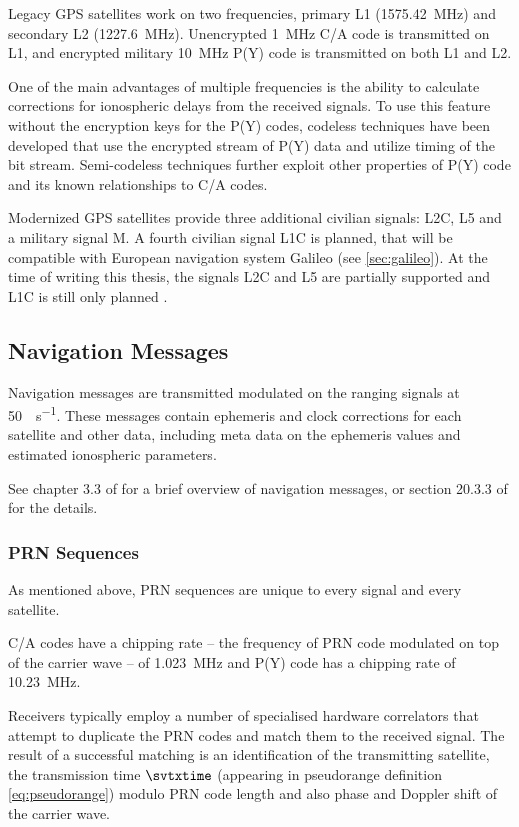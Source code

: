 Legacy GPS satellites work on two frequencies, primary L1 (\SI{1575.42}{\mega\hertz}) and secondary L2 (\SI{1227.6}{\mega\hertz}).
Unencrypted \SI{1}{\mega\hertz} C/A code is transmitted on L1, and encrypted military \SI{10}{\mega\hertz} P(Y) code is transmitted
on both L1 and L2.

One of the main advantages of multiple frequencies is the ability to calculate corrections for ionospheric delays from the received signals.
To use this feature without the encryption keys for the P(Y) codes, codeless techniques have been developed
that use the encrypted stream of P(Y) data and utilize timing of the bit stream.
Semi-codeless techniques further exploit other properties of P(Y) code and its known relationships to C/A codes.

Modernized GPS satellites provide three additional civilian signals:
L2C, L5 and a military signal M. A fourth civilian signal L1C is planned, that will be compatible with
European navigation system Galileo (see \ref{sec:galileo}).
At the time of writing this thesis, the signals L2C and L5 are partially supported and L1C is still only
planned \cite{gps-modernization-www}.

\subsection{Navigation Messages}
Navigation messages are transmitted modulated on the ranging signals at \SI{50}{\bit\per\second}.
These messages contain ephemeris and clock corrections for each satellite
and other data, including meta data on the ephemeris values and estimated
ionospheric parameters.

See chapter 3.3 of \cite{rizos99} for a brief overview of navigation messages,
or section 20.3.3 of \cite{fyfe92} for the details.

\subsubsection{PRN Sequences}
As mentioned above, PRN sequences are unique to every signal and every satellite.

C/A codes have a chipping rate -- the frequency of PRN code modulated on top
of the carrier wave -- of \SI{1.023}{\mega\hertz} and P(Y) code has a chipping rate
of \SI{10.23}{\mega\hertz}.

Receivers typically employ a number of specialised hardware correlators
that attempt to duplicate the PRN codes and match them to the received signal.
The result of a successful matching is an identification of the transmitting satellite,
the transmission time \(\svtxtime\) (appearing in pseudorange definition \eqref{eq:pseudorange})
modulo PRN code length and also phase and Doppler shift of the carrier wave.

